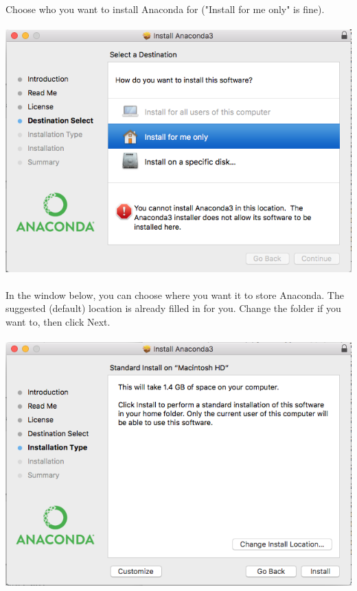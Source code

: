 \documentclass[]{article}
\begin{document}
\paragraph{}
Choose who you want to install Anaconda for ("Install for me only" is fine).
\paragraph{}
\begin{centering}
    \centerline{\includegraphics[scale=0.7]{Screenshot_7.png}}
\end{centering}

\paragraph{}
In the window below, you can choose where you want it to store Anaconda. The suggested (default) location is already filled in for you. Change the folder if you want to, then click Next.
\paragraph{}
\begin{centering}
    \centerline{\includegraphics[scale=0.7]{Screenshot_8.png}}
\end{centering}
\end{document}
